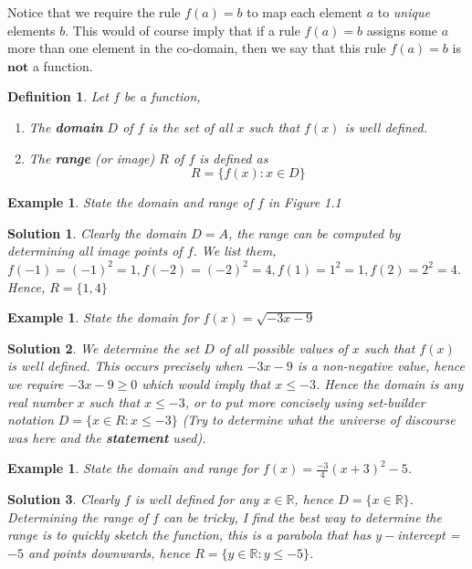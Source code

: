 \documentclass[12pt]{article}
\newcommand{\R}{\mathbb{R}}
\theoremstyle{break}
\newtheorem{ex}[thm]{Example}
\newtheorem*{soln}{Solution}
\newtheorem{defn}{Definition}[subsection]
\begin{document}
Notice that we require the rule $f(a) = b$ to map each element $a$ to \emph{unique} elements $b$. This would of course imply that if a rule $f(a) = b$ assigns some $a$ more than one element in the co-domain, then we say that this rule $f(a) = b$ is $\textbf{not}$ a function.


\begin{defn}
Let $f$ be a function,

\begin{enumerate}
\item The \textbf{domain} $D$ of $f$ is the set of all $x$ such that $f(x)$ is well defined.
\item The \textbf{range} (or image) $R$ of $f$ is defined as $$R = \{f(x) \colon x\in D \}$$
\end{enumerate}

\end{defn}

\newpage


\begin{ex}
State the domain and range of $f$ in Figure 1.1
\end{ex}


\begin{soln}
Clearly the domain $D = A$, the range can be computed by determining all image points of $f$. We list them, $f(-1) = (-1)^2 = 1, f(-2) = (-2)^2 = 4, f(1) = 1^2 = 1, f(2) = 2^2 = 4$. Hence, $R = \{1,4\}$
\end{soln}

\vspace*{0.5cm}


\begin{ex}
State the domain for $f(x) = \sqrt{-3x - 9}$
\end{ex}


\begin{soln}
 We determine the set $D$ of all possible values of $x$ such that $f(x)$ is well defined. This occurs precisely when $-3x-9$ is a non-negative value, hence we require $-3x-9 \geq 0$ which would imply that $x \leq -3$. Hence the domain is any real number $x$ such that $x\leq -3$, or to put more concisely using set-builder notation $D = \{x\in R \colon x\leq -3 \}$ (Try to determine what the universe of discourse was here and the \textbf{statement} used).
\end{soln}


\vspace*{0.5cm}

\begin{ex}
State the domain and range for $f(x) = \frac{-3}{4}(x+3)^2 - 5$.
\end{ex}

\begin{soln}
Clearly $f$ is well defined for any $x\in \R$, hence $D = \{x\in \R\}$. Determining the range of $f$ can be tricky, I find the best way to determine the range is to quickly sketch the function, this is a parabola that has $y-$intercept = $-5$ and points \emph{downwards}, hence $R = \{y\in \R \colon y \leq -5 \}$.
\end{soln}
\end{document}
